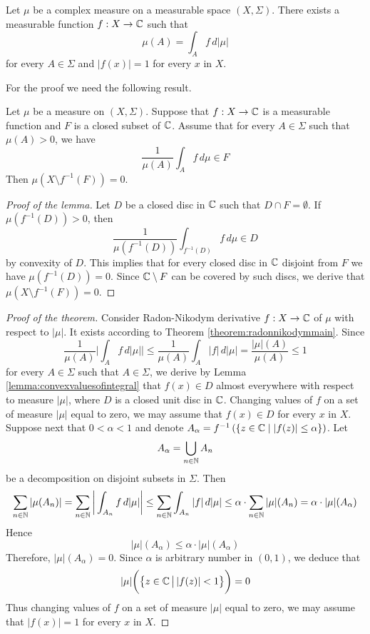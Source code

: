 \begin{theorem}\label{theorem:structureofcomplexmeasures}
Let $\mu$ be a complex measure on a measurable space $(X,\Sigma)$. There exists a measurable function $f:X\rightarrow {\mathbb C}$ such that
$$\mu(A) = \int_Af\,d|\mu|$$
for every $A\in \Sigma$ and $|f(x)|=1$ for every $x$ in $X$.
\end{theorem}
\noindent
For the proof we need the following result.
\begin{lemma}\label{lemma:convexvaluesofintegral}
Let $\mu$ be a measure on $(X,\Sigma)$. Suppose that $f:X\rightarrow {\mathbb C}$ is a measurable function and $F$ is a closed subset of ${\mathbb C}$. Assume that for every $A\in \Sigma$ such that $\mu(A)>0$, we have
$$\frac{1}{\mu(A)}\int_A f\,d\mu \in F$$
Then $\mu\left(X\setminus f^{-1}(F)\right)=0$.
\end{lemma}
\begin{proof}[Proof of the lemma]
Let $D$ be a closed disc in ${\mathbb C}$ such that $D\cap F = \emptyset$. If $\mu\left(f^{-1}(D)\right) > 0$, then
$$\frac{1}{\mu\left(f^{-1}(D)\right)}\int_{f^{-1}(D)}f\,d\mu \in D$$
by convexity of $D$. This implies that for every closed disc in ${\mathbb C}$ disjoint from $F$ we have $\mu\left(f^{-1}(D)\right) = 0$. Since ${\mathbb C}\setminus F$ can be covered by such discs, we derive that $\mu\left(X\setminus f^{-1}(F)\right)=0$.
\end{proof}

\begin{proof}[Proof of the theorem]
Consider Radon-Nikodym derivative $f:X\rightarrow {\mathbb C}$ of $\mu$ with respect to $|\mu|$. It exists according to Theorem \ref{theorem:radonnikodymmain}. Since
$$\frac{1}{\mu(A)}\bigg|\int_Af\,d|\mu|\bigg| \leq \frac{1}{\mu(A)}\int_A|f|\,d|\mu| = \frac{|\mu|(A)}{\mu(A)}\leq 1$$
for every $A\in \Sigma$ such that $A\in \Sigma$, we derive by Lemma \ref{lemma:convexvaluesofintegral} that $f(x)\in D$ almost everywhere with respect to measure $|\mu|$, where $D$ is a closed unit disc in ${\mathbb C}$. Changing values of $f$ on a set of measure $|\mu|$ equal to zero, we may assume that $f(x)\in D$ for every $x$ in $X$.\\
Suppose next that  $0<\alpha < 1$ and denote $A_{\alpha} = f^{-1}\left(\{z\in {\mathbb C}\mid|f(z)|\leq \alpha \}\right)$. Let
$$A_{\alpha} = \bigcup_{n\in {\mathbb N}}A_n$$
be a decomposition on disjoint subsets in $\Sigma$. Then
$$\sum_{n\in {\mathbb N}}|\mu(A_n)| = \sum_{n\in {\mathbb N}}\bigg|\int_{A_n}f\,d|\mu|\bigg|\leq  \sum_{n\in {\mathbb N}}\int_{A_n}|f|\,d|\mu| \leq \alpha \cdot \sum_{n\in {\mathbb N}} |\mu|(A_n) = \alpha\cdot |\mu|(A_{\alpha})$$
Hence
$$|\mu|(A_{\alpha}) \leq \alpha\cdot |\mu|(A_{\alpha})$$
Therefore, $|\mu|(A_{\alpha})=0$. Since $\alpha$ is arbitrary number in $(0,1)$, we deduce that
$$|\mu|\bigg(\big\{z\in {\mathbb C}\,\big|\,|f(z)| < 1\big\}\bigg) = 0$$
Thus changing values of $f$ on a set of measure $|\mu|$ equal to zero, we may assume that $|f(x)|=1$ for every $x$ in $X$.
\end{proof}

